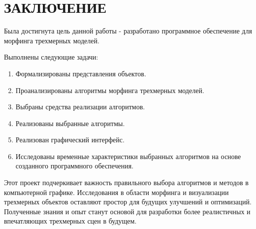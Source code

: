 \chapter*{ЗАКЛЮЧЕНИЕ}

Была достигнута цель данной работы - разработано программное обеспечение для морфинга трехмерных моделей.

Выполнены следующие задачи:
\begin{enumerate}
	\item Формализированы представления объектов.
	\item Проанализированы алгоритмы морфинга трехмерных моделей.
	\item Выбраны средства реализации алгоритмов.
	\item Реализованы выбранные алгоритмы.
	\item Реализован графический интерфейс.
	\item Исследованы временные характеристики выбранных алгоритмов на основе созданного программного обеспечения.
\end{enumerate}


Этот проект подчеркивает важность правильного выбора алгоритмов и методов в компьютерной графике. Исследования в области морфинга и визуализации трехмерных объектов оставляют простор для будущих улучшений и оптимизаций. Полученные знания и опыт станут основой для разработки более реалистичных и впечатляющих трехмерных сцен в будущем.